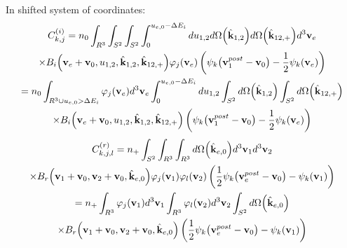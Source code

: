 \documentclass{article}[draft]
\begin{document}
In shifted system of coordinates:
\begin{multline*}
C^{(i)}_{k,j} = 
n_0
\int_{R^3} 
\int_{S^2} \int_{S^2} \int_{0}^{u_{e,0} - \Delta E_i} 
d u_{1,2} d\Omega\of{\hat{\vect{k}}_{1,2}} d\Omega\of{\hat{\vect{k}}_{12,+}} d^3 \vect{v}_e
\\
\times B_i\of{\vect{v}_e + \vect{v}_0, u_{1,2}, \hat{\vect{k}}_{1,2}, \hat{\vect{k}}_{12,+}} \varphi_{j} \of{\vect{v}_e} 
\left( \psi_k\of{\vect{v}_1^{post} - \vect{v}_0}  
- \frac12 \psi_k\of{\vect{v}_e} \right)
\\
= 
n_0
\int_{R^3 \cup u_{e,0} > \Delta E_i} \varphi_{j} \of{\vect{v}_e} d^3 \vect{v}_e
\int_{0}^{u_{e,0} - \Delta E_i} d u_{1,2}
\int_{S^2} d\Omega\of{\hat{\vect{k}}_{1,2}} 
\int_{S^2} d\Omega\of{\hat{\vect{k}}_{12,+}} 
\\
\times B_i\of{\vect{v}_e + \vect{v}_0, u_{1,2}, \hat{\vect{k}}_{1,2}, \hat{\vect{k}}_{12,+}}  
\left( \psi_k\of{\vect{v}_1^{post} - \vect{v}_0}  
- \frac12 \psi_k\of{\vect{v}_e} \right)
\end{multline*}
\begin{multline*}
C^{(r)}_{k,j,l}  =
n_+
\int_{S^2} 
\int_{R^3} \int_{R^3} 
d \Omega\of{\hat{\vect{k}}_{e,0}}
d^3 \vect{v}_1 d^3 \vect{v}_2 
\\
\times B_r\of{\vect{v}_1+\vect{v}_0, \vect{v}_2+\vect{v}_0, \hat{\vect{k}}_{e,0}}
\varphi_{j}\of{\vect{v}_1}  \varphi_{l}\of{\vect{v}_2} 
\left( \frac12 \psi_k\of{\vect{v}_e^{post} - \vect{v}_0}
- \psi_k\of{\vect{v}_1} \right)
\\
=
n_+
\int_{R^3} \varphi_{j}\of{\vect{v}_1} d^3 \vect{v}_1
\int_{R^3} \varphi_{l}\of{\vect{v}_2} d^3 \vect{v}_2 
\int_{S^2}
d \Omega\of{\hat{\vect{k}}_{e,0}}
\\
\times B_r\of{\vect{v}_1+\vect{v}_0, \vect{v}_2+\vect{v}_0, \hat{\vect{k}}_{e,0}}
\left( \frac12 \psi_k\of{\vect{v}_e^{post} - \vect{v}_0}
- \psi_k\of{\vect{v}_1} \right)
\end{multline*}

\clearpage
\end{document}
